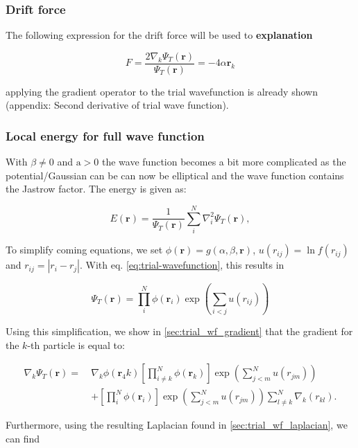 \documentclass[
]{article}
\begin{document}
\hypertarget{drift-force}{%
\subsubsection{Drift force}\label{drift-force}}

The following expression for the drift force will be used to
\textbf{explanation}

\[ F = \frac{2 \nabla_k \Psi_T(\mathbf{r})}{\Psi_T(\mathbf{r})} = -4 \alpha \mathbf{r}_{k} \]

applying the gradient operator to the trial wavefunction is already
shown (appendix: Second derivative of trial wave function).

\hypertarget{local-energy-for-full-wave-function}{%
\subsubsection{Local energy for full wave
function}\label{local-energy-for-full-wave-function}}

With \(\beta \ne 0\) and \(\text{a} > 0\) the wave function becomes a
bit more complicated as the potential/Gaussian can be can now be
elliptical and the wave function contains the Jastrow factor. The energy
is given as:

\[ E(\mathbf{r}) = \frac{1}{\Psi_T(\mathbf{r})}\sum_i^{N}\nabla_i^2\Psi_T(\mathbf{r}), \]

To simplify coming equations, we set
\(\phi(\mathbf r) = g(\alpha, \beta, \mathbf r)\),
\(u(r_{ij}) = \ln f(r_{ij})\) and \(r_{ij} = |r_i - r_j|\). With eq.
\eqref{eq:trial-wavefunction}, this results in

\[\Psi_T(\mathbf{r})=\prod_i^N \phi(\mathbf{r}_i) \exp{\left(\sum_{i<j}u(r_{ij})\right)}\]

Using this simplification, we show in \ref{sec:trial_wf_gradient} that
the gradient for the \(k\)-th particle is equal to:

\begin{align*} 
\nabla_k \Psi_T (\mathbf{r}) =\ &\nabla_k \phi (\mathbf{r}_ 4k)\left[\prod^N_{i \ne k}{\phi(\mathbf{r}_ k)} \right] \exp \left( \sum^N _{j<m} u(r _{jm})\right) \\ &+ \left[\prod^N _i\phi(\mathbf{r}_ i)\right] \exp \left( \sum^N _ {j<m} u(r _ {jm})\right) \sum^N _ {l\ne k } \nabla_ k (r_ {kl}).
\end{align*}

Furthermore, using the resulting Laplacian found in
\ref{sec:trial_wf_laplacian}, we can find
\end{document}
